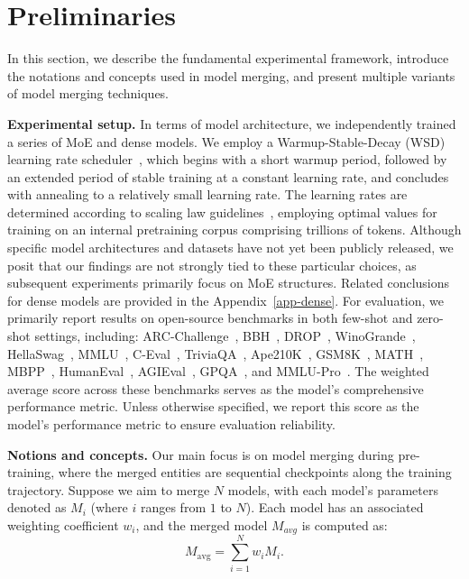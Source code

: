 \section{Preliminaries}
In this section, we describe the fundamental experimental framework, introduce the notations and concepts used in model merging, and present multiple variants of model merging techniques.

\textbf{Experimental setup.} In terms of model architecture, we independently trained a series of MoE and dense models. We employ a Warmup-Stable-Decay (WSD) learning rate scheduler~\cite{hu2024minicpm}, which begins with a short warmup period, followed by an extended period of stable training at a constant learning rate, and concludes with annealing to a relatively small learning rate. The learning rates are determined according to scaling law guidelines~\cite{bi2024deepseek, kaplan2020scaling}, employing optimal values for training on an internal pretraining corpus comprising trillions of tokens.
Although specific model architectures and datasets have not yet been publicly released, we posit that our findings are not strongly tied to these particular choices, as subsequent experiments primarily focus on MoE structures. Related conclusions for dense models are provided in the Appendix~\ref{app-dense}.
For evaluation, we primarily report results on open-source benchmarks in both few-shot and zero-shot settings, including: ARC-Challenge~\cite{clark2018think}, BBH~\cite{suzgun2022challenging}, DROP~\cite{dua2019drop}, WinoGrande~\cite{sakaguchi2021winogrande}, HellaSwag~\cite{zellers2019hellaswag}, MMLU~\cite{hendrycks2020measuring}, C-Eval~\cite{huang2023c}, TriviaQA~\cite{joshi2017triviaqa}, Ape210K~\cite{zhao2020ape210k}, GSM8K~\cite{cobbe2021training}, MATH~\cite{zhao2020ape210k}, MBPP~\cite{austin2021program}, HumanEval~\cite{chen2021evaluating}, AGIEval~\cite{zhong2023agieval}, GPQA~\cite{rein2024gpqa}, and MMLU-Pro~\cite{wang2024mmlu}. The weighted average score across these benchmarks serves as the model's comprehensive performance metric. Unless otherwise specified, we report this score as the model's performance metric to ensure evaluation reliability.

\textbf{Notions and concepts.} 
Our main focus is on model merging during pre-training, where the merged entities are sequential checkpoints along the training trajectory. Suppose we aim to merge \( N \) models, with each model's parameters denoted as \( M_i \) (where \( i \) ranges from \( 1 \) to \( N \)). Each model has an associated weighting coefficient \( w_i \), and the merged model \( M_{avg} \) is computed as:
\begin{equation}
M_{\text{avg}} = \sum_{i=1}^{N} w_{i} M_{i}.
\end{equation}


